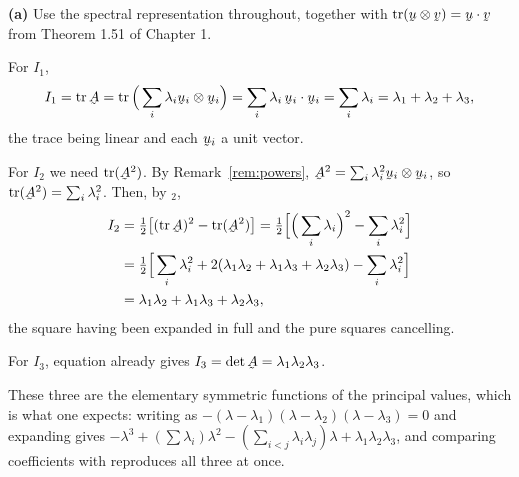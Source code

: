 \begin{solution}
\textbf{(a)} Use the spectral representation  throughout, together
with $\tr(\bu\otimes\bv)=\ip\bu\bv$ from Theorem 1.51 of Chapter 1.

For $I_{1}$,
\[
   I_{1}=\tr\bA=\tr\Big(\sum_{i}\lambda_{i}\bu_{i}\otimes\bu_{i}\Big)
   =\sum_{i}\lambda_{i}\,\ip{\bu_{i}}{\bu_{i}}
   =\sum_{i}\lambda_{i}=\lambda_{1}+\lambda_{2}+\lambda_{3},
\]
the trace being linear and each $\bu_{i}$ a unit vector.

For $I_{2}$ we need $\tr(\bA^{2})$. By Remark~\ref{rem:powers},
$\bA^{2}=\sum_{i}\lambda_{i}^{2}\bu_{i}\otimes\bu_{i}$, so
$\tr(\bA^{2})=\sum_{i}\lambda_{i}^{2}$. Then, by $_{2}$,
\[
\begin{aligned}
   I_{2}&=\tfrac12\big[(\tr\bA)^{2}-\tr(\bA^{2})\big]
   =\tfrac12\Big[\Big(\sum_{i}\lambda_{i}\Big)^{2}
                 -\sum_{i}\lambda_{i}^{2}\Big]\\
   &=\tfrac12\Big[\sum_{i}\lambda_{i}^{2}
      +2(\lambda_{1}\lambda_{2}+\lambda_{1}\lambda_{3}
        +\lambda_{2}\lambda_{3})-\sum_{i}\lambda_{i}^{2}\Big]\\
   &=\lambda_{1}\lambda_{2}+\lambda_{1}\lambda_{3}+\lambda_{2}\lambda_{3},
\end{aligned}
\]
the square having been expanded in full and the pure squares cancelling.

For $I_{3}$, equation  already gives
$I_{3}=\det\bA=\lambda_{1}\lambda_{2}\lambda_{3}$.

These three are the elementary symmetric functions of the principal
values, which is what one expects: writing  as
$-(\lambda-\lambda_{1})(\lambda-\lambda_{2})(\lambda-\lambda_{3})=0$ and
expanding gives
$-\lambda^{3}+(\sum\lambda_{i})\lambda^{2}
-(\sum_{i<j}\lambda_{i}\lambda_{j})\lambda
+\lambda_{1}\lambda_{2}\lambda_{3}$, and comparing coefficients with
 reproduces all three at once.


\end{solution}
